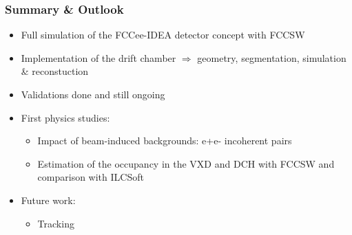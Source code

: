\documentclass[aspectratio=169, hyperref={colorlinks=true,pdfpagelabels=false,linkcolor=black}, xcolor=dvipsnames,10pt]{beamer}
\begin{document}
\label{lastslide}
\begin{frame}
  \frametitle{Summary \& Outlook}
  
	\begin{itemize}
	\item Full simulation of the FCCee-IDEA detector concept with FCCSW
	\item Implementation of the drift chamber 
		$\Rightarrow$ geometry, segmentation, simulation \& reconstuction
	\item Validations done and still ongoing 
	\item First physics studies:
		\begin{itemize}
		\item Impact of beam-induced backgrounds: e+e- incoherent pairs
	  	\item Estimation of the occupancy in the VXD and DCH with FCCSW and comparison with ILCSoft
	  	\end{itemize}
	\item Future work:
		\begin{itemize}
		\item Tracking
		\end{itemize}
  	\end{itemize}

\end{frame}
\end{document}
